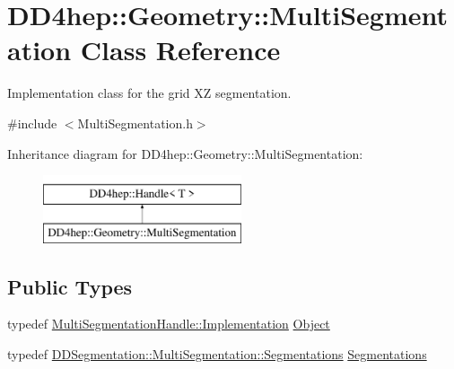 \hypertarget{class_d_d4hep_1_1_geometry_1_1_multi_segmentation}{}\section{D\+D4hep\+:\+:Geometry\+:\+:Multi\+Segmentation Class Reference}
\label{class_d_d4hep_1_1_geometry_1_1_multi_segmentation}


Implementation class for the grid XZ segmentation.  




{\ttfamily \#include $<$Multi\+Segmentation.\+h$>$}

Inheritance diagram for D\+D4hep\+:\+:Geometry\+:\+:Multi\+Segmentation\+:\begin{figure}[H]
\begin{center}
\leavevmode
\includegraphics[height=2.000000cm]{class_d_d4hep_1_1_geometry_1_1_multi_segmentation}
\end{center}
\end{figure}
\subsection*{Public Types}
\begin{DoxyCompactItemize}
\item 
typedef \hyperlink{class_d_d4hep_1_1_handle_ad7ff728a25806079516b8965b9113f1a}{Multi\+Segmentation\+Handle\+::\+Implementation} \hyperlink{class_d_d4hep_1_1_geometry_1_1_multi_segmentation_ab30207d7b5e4366c7227de5743a88452}{Object}
\item 
typedef \hyperlink{class_d_d4hep_1_1_d_d_segmentation_1_1_multi_segmentation_a083ba7cc081c5c3c47cafac5980100f8}{D\+D\+Segmentation\+::\+Multi\+Segmentation\+::\+Segmentations} \hyperlink{class_d_d4hep_1_1_geometry_1_1_multi_segmentation_ae2c7165290144f20af27248eab1858c5}{Segmentations}
\end{DoxyCompactItemize}
